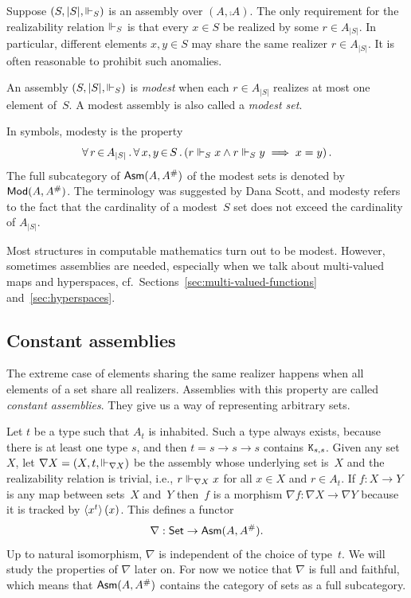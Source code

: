Suppose $(S, |S|, {\Vdash_S})$ is an assembly over $(A, \comp{A})$. The
only requirement for the realizability relation $\Vdash_S$ is that every
$x \in S$ be realized by some $r \in A_{|S|}$. In particular,
different elements $x, y \in S$ may share the same realizer $r \in
A_{|S|}$. It is often reasonable to prohibit such anomalies.

\begin{definition}
  An assembly $(S, |S|, {\Vdash_S})$ is \emph{modest} when each $r \in
  A_{|S|}$ realizes at most one element of~$S$. A modest assembly is
  also called a \emph{modest set}.
\end{definition}

\noindent
In symbols, modesty is the property
%
\begin{equation*}
  \forall\, r \,{\in}\, A_{|S|}\,.\,
    \forall\, x,y \,{\in}\, S\,.\left(
      r \Vdash_S x \land r \Vdash_S y \implies x = y
    \right)
 .
\end{equation*}
%
The full subcategory of $\mathsf{Asm}(A,A^{\#})$ of the modest sets is
denoted by~$\mathsf{Mod}(A, A^{\#})$. The terminology was suggested by Dana
Scott, and modesty refers to the fact that the cardinality of a
modest~$S$ set does not exceed the cardinality of $A_{|S|}$.

Most structures in computable mathematics turn out to be modest.
However, sometimes assemblies are needed, especially when we talk
about multi-valued maps and hyperspaces,
cf.~Sections~\ref{sec:multi-valued-functions}
and~\ref{sec:hyperspaces}.


\subsection{Constant assemblies}
\label{sec:nabla}

The extreme case of elements sharing the same realizer happens when
all elements of a set share all realizers. Assemblies with this
property are called \emph{constant assemblies}. They give us a way of
representing arbitrary sets.

Let $t$ be a type such that $A_t$ is inhabited. Such a type always
exists, because there is at least one type $s$, and then $t = s \to s
\to s$ contains $\mathtt{K}_{s,s}$. Given any set $X$, let $\nabla X = (X,
t, {\Vdash_{\nabla X}})$ be the assembly whose underlying set is~$X$ and
the realizability relation is trivial, i.e., $r \Vdash_{\nabla X} x$ for
all $x \in X$ and $r \in A_t$. If $f : X \to Y$ is any map between
sets~$X$ and~$Y$ then~$f$ is a morphism $\nabla f : \nabla X \to
\nabla Y$ because it is tracked by $\langle x^{t} \rangle\,(x)$. This
defines a functor
%
\begin{equation*}
  \nabla : \mathsf{Set} \to \mathsf{Asm}(A,A^{\#}).
\end{equation*}
%
Up to natural isomorphism, $\nabla$ is independent of the choice of
type~$t$. We will study the properties of $\nabla$ later on. For now
we notice that $\nabla$ is full and faithful, which means that
$\mathsf{Asm}(A,A^{\#})$ contains the category of sets as a full
subcategory.

